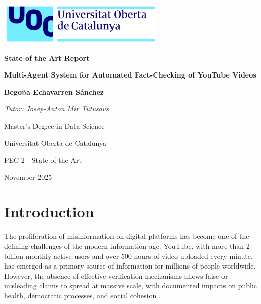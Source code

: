 \documentclass[12pt,a4paper]{article}
\begin{document}
\begin{titlepage}
    \begin{center}
    \vspace*{0.5cm}

    \includegraphics[width=0.6\textwidth]{../../assets/uoc_logo.png}

    \vspace{1.5cm}

    {\Huge \textbf{State of the Art Report}}

    \vspace{2cm}

    {\LARGE \textbf{Multi-Agent System for Automated Fact-Checking of YouTube Videos}}

    \vspace{2.5cm}

    \textbf{\large Begoña Echavarren Sánchez}

    \vspace{0.5cm}

    \textit{Tutor: Josep-Anton Mir Tutusaus}

    \vspace{2cm}

    {\large Master's Degree in Data Science}

    {\large Universitat Oberta de Catalunya}

    \vspace{1cm}

    {\large PEC 2 - State of the Art}

    \vspace{0.5cm}

    {\large November 2025}

    \end{center}
\end{titlepage}

\newpage
{}

\hypersetup{linkcolor=black}
\tableofcontents
\hypersetup{linkcolor=blue}

\newpage

\section{Introduction}

The proliferation of misinformation on digital platforms has become one of the defining challenges of the modern information age. YouTube, with more than 2 billion monthly active users and over 500 hours of video uploaded every minute, has emerged as a primary source of information for millions of people worldwide. However, the absence of effective verification mechanisms allows false or misleading claims to spread at massive scale, with documented impacts on public health, democratic processes, and social cohesion \citep{aly2021feverous, benkler2018network, wardle2017information}.
\end{document}
